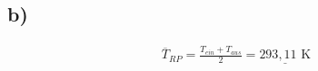 

\subsection*{b)}
\begin{align*}
\overline{T}_{RP} = \frac{T_{ein} + T_{aus}}{2} = \underline{293,11 \text{ K}}
\end{align*}